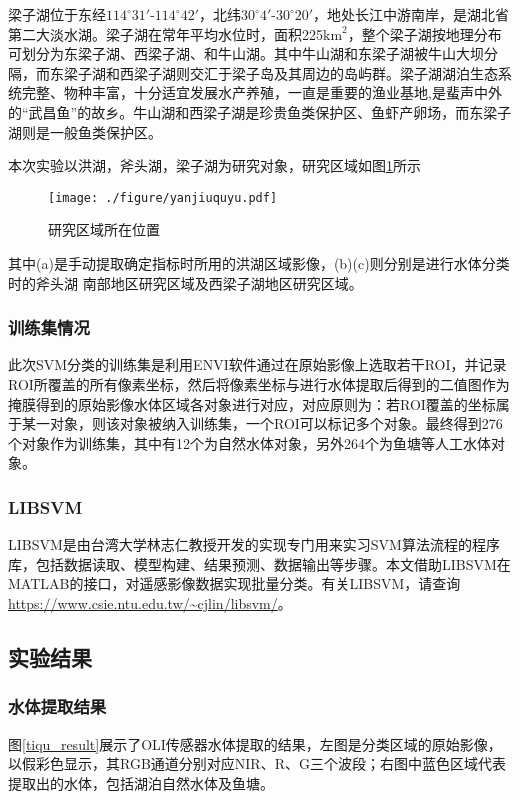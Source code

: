 \documentclass[supercite]{upcthesis}
\begin{document}
梁子湖位于东经$\text{114}^\circ\text{31}'$-$\text{114}^\circ\text{42}'$，北纬$\text{30}^\circ \text{4}'$-$\text{30}^\circ \text{20}'$，地处长江中游南岸，是湖北省第二大淡水湖。梁子湖在常年平均水位时，面积225$\text{km}^2$，整个梁子湖按地理分布可划分为东梁子湖、西梁子湖、和牛山湖。其中牛山湖和东梁子湖被牛山大坝分隔，而东梁子湖和西梁子湖则交汇于梁子岛及其周边的岛屿群。梁子湖湖泊生态系统完整、物种丰富，十分适宜发展水产养殖，一直是重要的渔业基地,是蜚声中外的“武昌鱼”的故乡。牛山湖和西梁子湖是珍贵鱼类保护区、鱼虾产卵场，而东梁子湖则是一般鱼类保护区。

本次实验以洪湖，斧头湖，梁子湖为研究对象，研究区域如图\ref{yanjiuquyu}所示
\begin{figure}[htbp]
	\centering
	\texttt{[image: ./figure/yanjiuquyu.pdf]}	
	\caption{研究区域所在位置}
	\label{yanjiuquyu}
\end{figure}
其中(a)是手动提取确定指标时所用的洪湖区域影像，(b)(c)则分别是进行水体分类时的斧头湖 南部地区研究区域及西梁子湖地区研究区域。
\subsubsection{训练集情况}
此次SVM分类的训练集是利用ENVI软件通过在原始影像上选取若干ROI，并记录ROI所覆盖的所有像素坐标，然后将像素坐标与进行水体提取后得到的二值图作为掩膜得到的原始影像水体区域各对象进行对应，对应原则为：若ROI覆盖的坐标属于某一对象，则该对象被纳入训练集，一个ROI可以标记多个对象。最终得到276个对象作为训练集，其中有12个为自然水体对象，另外264个为鱼塘等人工水体对象。
\subsubsection{LIBSVM}
LIBSVM是由台湾大学林志仁教授开发的实现专门用来实习SVM算法流程的程序库，包括数据读取、模型构建、结果预测、数据输出等步骤。本文借助LIBSVM在MATLAB的接口，对遥感影像数据实现批量分类。有关LIBSVM，请查询\url{https://www.csie.ntu.edu.tw/~cjlin/libsvm/}。
\subsection{实验结果}
\subsubsection{水体提取结果}
\begin{figure*}[htbp]
	\centering
	\caption{OLI传感器水体提取结果}
	\label{tiqu_result}
\end{figure*}
图\ref{tiqu_result}展示了OLI传感器水体提取的结果，左图是分类区域的原始影像，以假彩色显示，其RGB通道分别对应NIR、R、G三个波段；右图中蓝色区域代表提取出的水体，包括湖泊自然水体及鱼塘。
\end{document}
